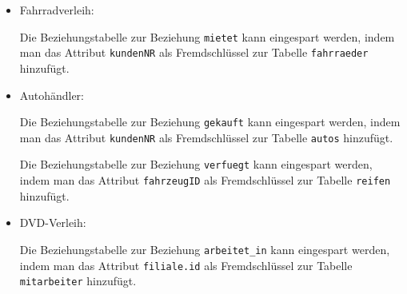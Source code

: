 \begin{Answer}[ref=Optimierung]
	\begin{itemize}
		\item Fahrradverleih:

		Die Beziehungstabelle zur Beziehung \lstinline!mietet! kann eingespart werden, indem man das Attribut \lstinline!kundenNR! als Fremdschlüssel zur Tabelle \lstinline!fahrraeder! hinzufügt.
		\item Autohändler:

		Die Beziehungstabelle zur Beziehung \lstinline!gekauft! kann eingespart werden, indem man das Attribut \lstinline!kundenNR! als Fremdschlüssel zur Tabelle \lstinline!autos! hinzufügt.

		Die Beziehungstabelle zur Beziehung \lstinline!verfuegt! kann eingespart werden, indem man das Attribut \lstinline!fahrzeugID! als Fremdschlüssel zur Tabelle \lstinline!reifen! hinzufügt.
		\item DVD-Verleih:

		Die Beziehungstabelle zur Beziehung \lstinline!arbeitet_in! kann eingespart werden, indem man das Attribut \lstinline!filiale.id! als Fremdschlüssel zur Tabelle \lstinline!mitarbeiter! hinzufügt.
	\end{itemize}
\end{Answer}